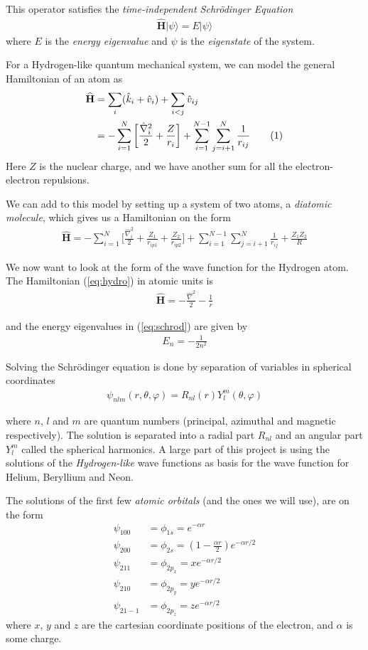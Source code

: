 \documentclass[twocolumns, a4paper,11pt,fleqn]{extarticle}
\newcommand{\eq}[1]{{\small\begin{align*}#1\end{align*}}}
\newcommand{\equ}[1]{{\small\begin{align}#1\end{align}}}
\newcommand{\ket}[1]{|#1\rangle}
\newcommand\numberthis{\addtocounter{equation}{1}\tag{\theequation}}
\newcommand{\OP}[1]{\mathbf{\widehat{#1}}}
\newcommand{\op}[1]{\hat{#1}}
\begin{document}
This operator satisfies the \textit{time-independent Schr\"odinger Equation}
\equ{
  \OP H \ket{\psi} = E \ket{\psi}\label{eq:schrod}
}
where $E$ is the \textit{energy eigenvalue} and $\psi$ is the \textit{eigenstate} of the system.

For a Hydrogen-like quantum mechanical system, we can model the general
Hamiltonian of an atom as
\eq{
  \OP H
  &=\sum_i (\op k_i + \op v_i)  + \sum_{i<j} \op v_{ij}\\
  &= -\sum_{i=1}^N\bigg[
    \frac{\op\nabla_i^2}{2} + \frac{Z}{r_i}\bigg] 
  + \sum_{i=1}^{N-1}\sum_{j=i+1}^N\frac{1}{r_{ij}} \numberthis\label{ham}
}
Here $Z$ is the nuclear charge, 
and we have another sum for all the electron-electron repulsions.

We can add to this model by setting up a system of two atoms,
a \textit{diatomic molecule}, which gives us a Hamiltonian on the form
\eq{
  \OP H = -\sum_{i=1}^N\bigg[
    \frac{\op\nabla_i^2}{2} + \frac{Z_1}{r_{ip1}} + \frac{Z_2}{r_{ip2}}\bigg] 
    + \sum_{i=1}^{N-1}\sum_{j=i+1}^N\frac{1}{r_{ij}} + \frac{Z_1 Z_2}{R}
}

We now want to look at the form of the wave function for the Hydrogen atom.
The Hamiltonian (\ref{eq:hydro}) in atomic units is
\eq{
  \OP H = -\frac{\op \nabla^2}{2}- \frac{1}{r}
}

and the energy eigenvalues in (\ref{eq:schrod}) are given by
\eq{
  E_n = -\frac{1}{2n^2}
}

Solving the Schr\"odinger equation is done by separation of variables in
spherical coordinates
\equ{
  \psi_{nlm}(r,\theta,\varphi) = R_{nl}(r) Y_l^{m}(\theta,\varphi)\label{eq:psi}
}

where $n$, $l$ and $m$ are quantum numbers 
(principal, azimuthal and magnetic respectively).
The solution is separated into a radial part $R_{nl}$ and an angular part $Y_l^{m}$
called the spherical harmonics.
A large part of this project is using the solutions of the \textit{Hydrogen-like}
wave functions as basis for the wave function for Helium, Beryllium and Neon.

The solutions of the first few \textit{atomic orbitals} (and the ones we will use), 
are on the form
\eq{
  \psi_{100} &= \phi_{1s} =  e^{-\alpha r}\\
  \psi_{200} &= \phi_{2s} =  \left(1-\frac{\alpha r}{2}\right)e^{-\alpha r/2} \\
  \psi_{211} &= \phi_{2p_x} = x e^{-\alpha r/2}\\
  \psi_{210} &= \phi_{2p_y} = y e^{-\alpha r/2}\\
  \psi_{21-1}&= \phi_{2p_z} = z e^{-\alpha r/2}
}
where $x$, $y$ and $z$ are the cartesian coordinate positions of the electron,
and $\alpha$ is some charge.
\end{document}
